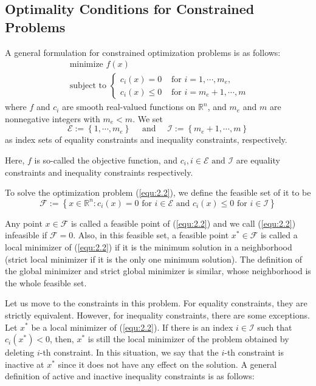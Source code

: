 \subsection{Optimality Conditions for Constrained Problems}
\label{sec:opt-con-constrained}
A general formulation for constrained optimization problems is as follows: 
\begin{equation}
\label{equ:2.2}
\begin{array}{l}\textrm { minimize } f(x) \\ \textrm { subject to }\left\{\begin{array}{ll}c_{i}(x)=0 & \textrm { for } i=1, \cdots, m_{e}, \\ c_{i}(x) \leq 0 & \textrm { for } i=m_{e}+1, \cdots, m\end{array}\right.\end{array}
\end{equation}
where $f$ and $c_i$ are smooth real-valued functions on $\mathbb{R}^n$, and $m_e$ and $m$ are nonnegative integers with $m_e < m$. We set 
$$
\mathscr{E}:=\left\{1, \cdots, m_{e}\right\} \quad \textrm { and } \quad \mathscr{I}:=\left\{m_{e}+1, \cdots, m\right\}
$$
as index sets of equality constraints and inequality constraints, respectively. 
\par Here, $f$ is so-called the objective function, and $c_i, i \in \mathscr{E} \textrm{ and } \mathscr{I}$ are equality constraints and inequality constraints respectively. 
\par To solve the optimization problem (\ref{equ:2.2}), we define the feasible set of it to be
$$
\mathscr{F}:=\left\{x \in \mathbb{R}^{n}: c_{i}(x)=0 \textrm { for } i \in \mathscr{E} \textrm { and } c_{i}(x) \leq 0 \textrm { for } i \in \mathscr{I}\right\}
$$
\par Any point $x \in \mathscr{F}$ is called a feasible point of (\ref{equ:2.2}) and we call (\ref{equ:2.2}) infeasible if $\mathscr{F} = 0$. Also, in this feasible set, a feasible point $x^* \in \mathscr{F}$ is called a local minimizer of (\ref{equ:2.2}) if it is the minimum solution in a neighborhood (strict local minimizer if it is the only one minimum solution). The definition of the global minimizer and strict global minimizer is similar, whose neighborhood is the whole feasible set. 
\par Let us move to the constraints in this problem. For equality constraints, they are strictly equivalent. However, for inequality constraints, there are some exceptions. Let $x^*$ be a local minimizer of (\ref{equ:2.2}). If there is an index $i \in \mathscr{I}$ such that $c_i(x^*) < 0$, then, $x^*$ is still the local minimizer of the problem obtained by deleting $i$-th constraint. In this situation, we say that the $i$-th constraint is inactive at $x^*$ since it does not have any effect on the solution. A general definition of active and inactive inequality constraints is as follows:
